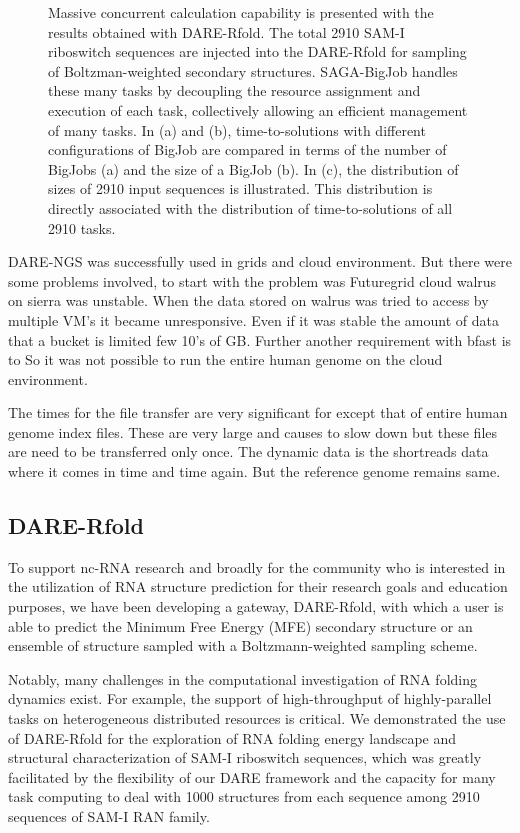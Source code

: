 \documentclass{sig-alternate}
\begin{document}
\begin{figure}
\caption{\small Massive concurrent calculation capability is presented with the results obtained with DARE-Rfold. The total 2910 SAM-I riboswitch sequences are injected into the DARE-Rfold for sampling of Boltzman-weighted secondary structures.  SAGA-BigJob handles these many tasks by decoupling the resource assignment and execution of each task, collectively allowing an efficient management of many tasks. In (a) and (b), time-to-solutions with different configurations of BigJob are compared in terms of the number of BigJobs (a) and the size of a BigJob (b).  In (c), the distribution of sizes of 2910 input sequences is illustrated.  This distribution is directly associated with the distribution of time-to-solutions of all 2910 tasks.}
  \label{fig:dare-rfold-result} 
\end{figure}

DARE-NGS was successfully used in grids and cloud environment. But there were some problems involved,  to start with the problem was  Futuregrid cloud walrus on sierra was unstable. When the data stored on walrus was tried to access by multiple VM's it became unresponsive. Even if it was stable the amount of data that a bucket is limited few 10's of GB. Further another requirement with bfast is to So it was not possible to run the entire human genome on the cloud environment.




The times for the file transfer are very significant for except that of entire human genome index files. These are very large and causes to slow down but these files are need to be transferred only once. The dynamic data is the shortreads data where it comes in time and time again. But the reference genome remains same. 





\subsection{DARE-Rfold}
To support nc-RNA research and broadly for the community who is interested in the utilization of RNA structure prediction for their research goals and education purposes, we have been developing a gateway, DARE-Rfold, with which a user is able to predict the Minimum Free Energy (MFE) secondary structure or an ensemble of structure sampled with a Boltzmann-weighted sampling scheme.  





Notably, many challenges in the computational investigation of RNA folding dynamics exist.  For example, the support of high-throughput of highly-parallel tasks on heterogeneous distributed resources is critical.
We demonstrated the use of DARE-Rfold for the exploration of RNA folding energy landscape and structural characterization of SAM-I riboswitch sequences, which was greatly facilitated by the flexibility of our DARE framework and the capacity for many task computing to deal with 1000 structures from each sequence among 2910 sequences of SAM-I RAN family\cite{ecmls10}. 
\end{document}
